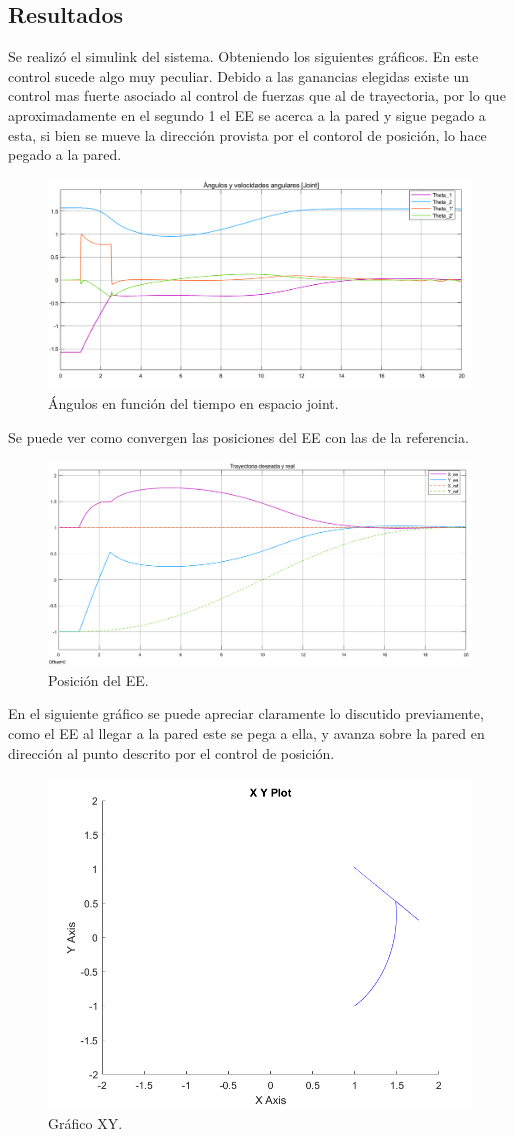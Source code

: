 \subsection{Resultados}
Se realiz\'o el simulink del sistema. Obteniendo los siguientes gr\'aficos.
En este control sucede algo muy peculiar. Debido a las ganancias elegidas existe un control mas fuerte asociado al control de fuerzas que al de trayectoria, por lo que aproximadamente en el segundo 1 el EE se acerca a la pared y sigue pegado a esta, si bien se mueve la dirección provista por el contorol de posición, lo hace pegado a la pared.
\begin{figure}[H]
	\centering
	\includegraphics[width=0.8\linewidth]{ImagenesControl híbrido no lineal/3_3_a}
	\caption{\'Angulos en funci\'on del tiempo en espacio joint.}	
	\label{fig:cthetas}
\end{figure}
Se puede ver como convergen las posiciones del EE con las de la referencia.
\begin{figure}[H]
	\centering
	\includegraphics[width=0.8\linewidth]{ImagenesControl híbrido no lineal/3_3_b}
	\caption{Posici\'on  del EE.}	
	\label{fig:cpos}
\end{figure}
En el siguiente gráfico se puede apreciar claramente lo discutido previamente, como el EE al llegar a la pared este se pega a ella, y avanza sobre la pared en dirección al punto descrito por el control de posición.
\begin{figure}[H]
	\centering
	\includegraphics[width=0.5\linewidth]{ImagenesControl híbrido no lineal/3_3_c}
	\caption{Gr\'afico XY.}	
	\label{fig:cxy}
\end{figure}
